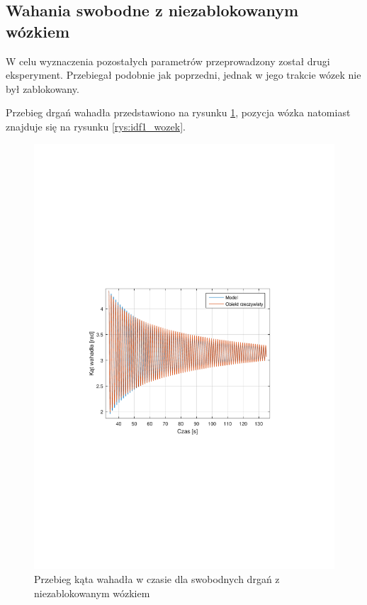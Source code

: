 \documentclass[12pt]{article}
\begin{document}
\newpage

\subsection{Wahania swobodne z niezablokowanym wózkiem}

W celu wyznaczenia pozostałych parametrów przeprowadzony został drugi
eksperyment. Przebiegał podobnie jak poprzedni, jednak w jego trakcie wózek nie
był zablokowany.

Przebieg drgań wahadła przedstawiono na rysunku \ref{rys:idf1_wahadlo},
pozycja wózka natomiast znajduje się na rysunku \ref{rys:idf1_wozek}.

\begin{figure}[!htb]
    \begin{center}
        \includegraphics[width=16cm,trim=3cm 9cm 3cm 9cm,clip]
        {../res/img/idf1_wahadlo.pdf}
    \end{center}
    \caption{Przebieg kąta wahadła w czasie dla swobodnych drgań z
    niezablokowanym wózkiem} 
    \label{rys:idf1_wahadlo}
\end{figure}
\end{document}
